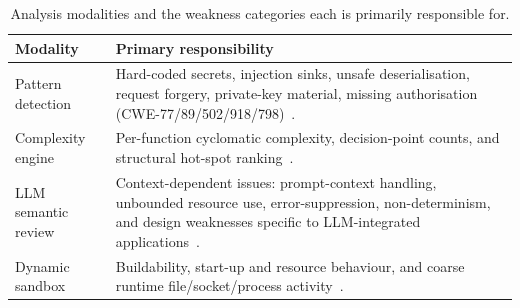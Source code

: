 \begin{table}[!tp]
  \centering
  \caption{Analysis modalities and the weakness categories each is
           primarily responsible for.}
  \label{tab:modalities}
  \renewcommand{\arraystretch}{1.2}
  \small
  \begin{tabularx}{0.86\textwidth}{@{}l X@{}}
    \toprule
    \textbf{Modality} & \textbf{Primary responsibility} \\
    \midrule
    Pattern detection &
      Hard-coded secrets, injection sinks, unsafe deserialisation,
      request forgery, private-key material, missing authorisation
      (CWE-77/89/502/918/798)~\cite{mitrecwe}. \\
    Complexity engine &
      Per-function cyclomatic complexity, decision-point counts, and
      structural hot-spot ranking~\cite{mccabe1976}. \\
    LLM semantic review &
      Context-dependent issues: prompt-context handling, unbounded
      resource use, error-suppression, non-determinism, and design
      weaknesses specific to LLM-integrated
      applications~\cite{owaspllm2025}. \\
    Dynamic sandbox &
      Buildability, start-up and resource behaviour, and coarse runtime
      file/socket/process activity~\cite{merkel2014docker}. \\
    \bottomrule
  \end{tabularx}
\end{table}
